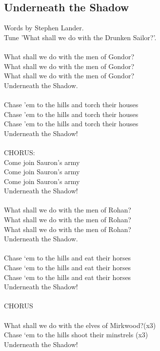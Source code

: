 \begin{multicols}{2}
\section{Underneath the Shadow}
Words by Stephen Lander.
\\
Tune ’What shall we do with the Drunken Sailor?’.
\\
\\
What shall we do with the men of Gondor?
\\
What shall we do with the men of Gondor?
\\
What shall we do with the men of Gondor?
\\
Underneath the Shadow.
\\
\\
Chase ’em to the hills and torch their houses
\\
Chase ’em to the hills and torch their houses
\\
Chase ’em to the hills and torch their houses
\\
Underneath the Shadow!
\\
\\
CHORUS:
\\
Come join Sauron’s army
\\
Come join Sauron’s army
\\
Come join Sauron’s army
\\
Underneath the Shadow!
\\
\\
What shall we do with the men of Rohan?
\\
What shall we do with the men of Rohan?
\\
What shall we do with the men of Rohan?
\\
Underneath the Shadow.
\\
\\
Chase ‘em to the hills and eat their horses
\\
Chase ‘em to the hills and eat their horses
\\
Chase ‘em to the hills and eat their horses
\\
Underneath the Shadow!
\\
\\
CHORUS
\\
\\
What shall we do with the elves of Mirkwood?(x3)
\\
Chase ‘em to the hills shoot their minstrels (x3)
\\
Underneath the Shadow!
\\

\end{multicols}

